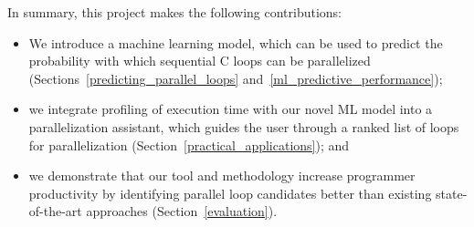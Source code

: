 In summary, this project makes the following contributions:
%
\begin{itemize}
\renewcommand\labelitemi{$\vartriangleright$}
\renewcommand\labelitemii{$\bullet$}
\item We introduce a machine learning model, which can be used to predict the probability with which sequential C loops can be parallelized (Sections~\ref{predicting_parallel_loops} and~\ref{ml_predictive_performance});
\item we integrate profiling of execution time with our novel ML model into a parallelization assistant, which guides the user through a ranked list of loops for parallelization (Section~\ref{practical_applications}); and
\item we demonstrate that our tool and methodology increase programmer productivity by identifying parallel loop candidates better than existing state-of-the-art approaches (Section~\ref{evaluation}).

%
\end{itemize}
